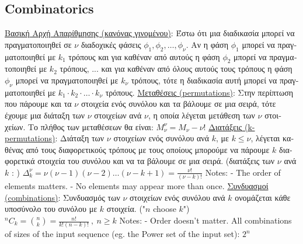 \documentclass[12pt]{article}
\begin{document}
\begin{flushleft}
	\subsection{Combinatorics}
	
	\textbullet \quad \uline{\textgreek{Βασική Αρχή Απαρίθμησης (κανόνας γινομένου)}}: \textgreek{Έστω ότι μια διαδικασία μπορεί να πραγματοποιηθεί σε} $\nu$ \textgreek{διαδοχικές φάσεις} $\phi_1, \phi_2, \ldots, \phi_{\nu}$. \textgreek{Αν η φάση} $\phi_1$ \textgreek{μπορεί να πραγματοποιηθεί με} $k_1$ \textgreek{τρόπους και για καθέναν από αυτούς η φάση} $\phi_2$ \textgreek{μπορεί να πραγματοποιηθεί με} $k_2$ \textgreek{τρόπους, ... και για καθέναν από όλους αυτούς τους τρόπους η φάση} $\phi_{\nu}$ \textgreek{μπορεί να πραγματοποιηθεί με} $k_{\nu}$ \textgreek{τρόπους, τότε η διαδικασία αυτή μπορεί να πραγματοποιηθεί με} $k_1 \cdot k_2 \cdot \ldots \cdot k_{\nu} $ \textgreek{τρόπους.} \linebreak 
		\textbullet \quad \uline{\textgreek{Μεταθέσεις} (permutations)}: \textgreek{Στην περίπτωση που πάρουμε και τα } $\nu$ \textgreek{στοιχεία ενός συνόλου και τα βάλουμε σε μια σειρά, τότε έχουμε μια διάταξη των} $\nu$ \textgreek{στοιχείων ανά} $\nu$, \textgreek{η οποία λέγεται μετάθεση των} $\nu$ \textgreek{στοιχείων. Το πλήθος των μεταθέσεων θα είναι}: $M_{\nu}^{\nu} = M_{\nu} - \nu ! $ \linebreak 
	\textbullet \quad \uline{\textgreek{Διατάξεις} (k-permutations)}: \textgreek{Διάταξη των} $\nu$ \textgreek{στοιχείων ενός συνόλου ανά} $k$, \textgreek{με} $k\leq \nu$, \textgreek{λέγεται καθένας από τους διαφορετικούς τρόπους με τους οποίους μπορούμε να πάρουμε} $k$ \textgreek{διαφορετικά στοιχεία του συνόλου και να τα βάλουμε σε μια σειρά. (διατάξεις των }$\nu$ \textgreek{ανά} $k$  : ) $\displaystyle \Delta_k^{\nu} = \nu (\nu -1) (\nu-2) \ldots(\nu -k + 1) = \frac{\nu!}{(\nu-k)!} $ \linebreak 
	Notes: \linebreak 
	- The order of elements matters. \linebreak 
	- No elements may appear more than once. \linebreak 
	\textbullet \quad \uline{\textgreek{Συνδυασμοί} (combinations)}: \textgreek{Συνδυασμός των} $\nu$ \textgreek{στοιχείων ενός συνόλου ανά} $k$ \textgreek{ονομάζεται κάθε υποσύνολο του συνόλου με} $k$ \textgreek{στοιχεία}. \linebreak 
	("$n$ choose $k$") $\displaystyle ^nC_k = \binom{n}{k} = \frac{n!}{k!(n-k)!}\ , \ n\geq k $ \linebreak 
	Notes: \linebreak 
	- Order doesn't matter. \linebreak 
	\textbullet \quad All combinations of sizes of the input sequence (eg. the Power set of the input set): \linebreak 
	$2^n$ \linebreak 
	

\end{flushleft}
\end{document}
